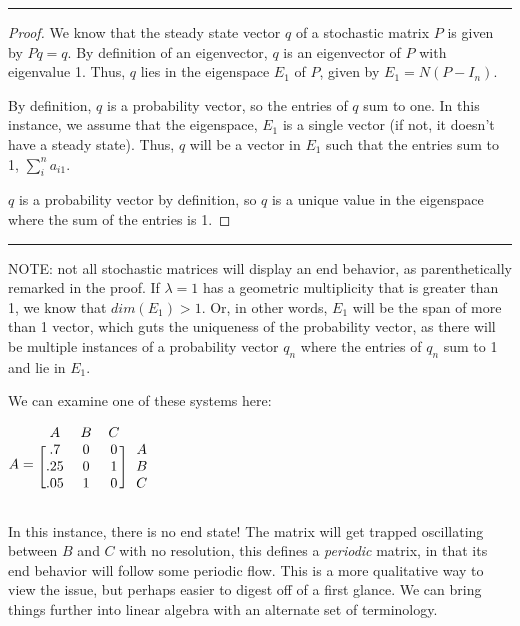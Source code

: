 \documentclass{article}
\begin{document}
\rule{\textwidth}{0.5pt}

\begin{proof}
    We know that the steady state vector $q$ of a stochastic matrix $P$ is given by $Pq=q.$ By definition of an eigenvector, $q$ is an eigenvector of $P$ with eigenvalue 1. Thus, $q$ lies in the eigenspace $E_1$ of $P$, given by $E_1=N(P-I_n).$ 

    By definition, $q$ is a probability vector, so the entries of $q$ sum to one. In this instance, we assume that the eigenspace, $E_1$ is a single vector (if not, it doesn't have a steady state). Thus, $q$ will be a vector in $E_1$ such that the entries sum to 1, $\sum_{i}^{n}a_{i1}$.
    
    $q$ is a probability vector by definition, so $q$ is a unique value in the eigenspace where the sum of the entries is 1.
    
\end{proof}
\rule{\textwidth}{0.5pt}

NOTE: not all stochastic matrices will display an end behavior, as parenthetically remarked in the proof. If $\lambda=1$ has a geometric multiplicity that is greater than 1, we know that $dim(E_1)>1$. Or, in other words, $E_1$ will be the span of more than 1 vector, which guts the uniqueness of the probability vector, as there will be multiple instances of a probability vector $q_n$ where the entries of $q_n$ sum to 1 and lie in $E_1$.

We can examine one of these systems here:

\begin{center}
    $A=\begin{blockarray}{cccc}
    A & B & C \\
        \begin{block}{[ccc]c} 
            .7& 0& 0 & A\\
            .25& 0& 1 & B\\
            .05& 1& 0 & C\\ 
        \end{block}
    \end{blockarray}$
\end{center}

In this instance, there is no end state! The matrix will get trapped oscillating between $B$ and $C$ with no resolution, this defines a \textit{periodic} matrix, in that its end behavior will follow some periodic flow. This is a more qualitative way to view the issue, but perhaps easier to digest off of a first glance. We can bring things further into linear algebra with an alternate set of terminology.
\end{document}

